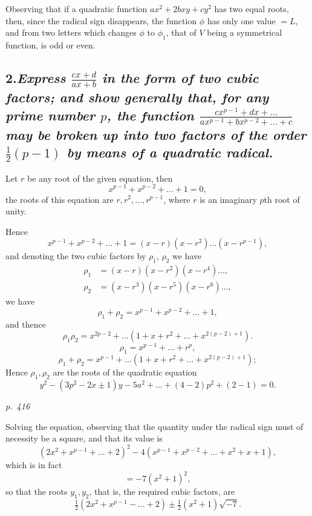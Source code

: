 \documentclass[11pt,a4paper]{article}
\theoremstyle{plain}
\theoremstyle{definition}
\begin{document}
Observing that if a quadratic function $a x^2 + 2 b x y + c y^2$ has two equal roots, then,
since the radical sign disappears, the function $\phi$ has only one value $= L$, and from
two letters which changes $\phi$ to $\phi_1$, that of $V$ being a symmetrical function,
is odd or even.

\subsection*{2.\quad \textit{Express $\frac{c x + d}{a x + b}$ in the form of two cubic factors; and show generally that, for any prime number $p$, the function $\frac{c x^{p-1} + d x + \ldots}{a x^{p-1} + b x^{p-2} + \ldots + c}$ may be broken up into two factors of the order $\frac{1}{2}(p-1)$ by means of a quadratic radical.}}

Let $r$ be any root of the given equation, then
\[
x^{p-1} + x^{p-2} + \ldots + 1 = 0,
\]
the roots of this equation are $r, r^2, \ldots, r^{p-1}$, where $r$ is an imaginary $p$th root of unity.

Hence
\[
x^{p-1} + x^{p-2} + \ldots + 1 = (x - r)(x - r^2) \ldots (x - r^{p-1}),
\]
and denoting the two cubic factors by $\rho_1$, $\rho_2$ we have
\begin{align*}
\rho_1 &= (x - r)(x - r^2)(x - r^4)\ldots, \\
\rho_2 &= (x - r^3)(x - r^5)(x - r^6)\ldots,
\end{align*}
we have
\[
\rho_1 + \rho_2 = x^{p-1} + x^{p-2} + \ldots + 1,
\]
and thence
\[
\rho_1 \rho_2 = x^{2p-2} + \ldots(1+x+r^2+\ldots+x^{2(p-2)+1}).
\]
\[
\rho_1 = x^{p-1} + \ldots + r^p,
\]
\[
\rho_1 + \rho_2 = x^{p-1} + \ldots(1+x+r^2+\ldots+x^{2(p-2)+1});
\]
Hence $\rho_1, \rho_2$ are the roots of the quadratic equation
\[
y^2 - (3 p^2 - 2 x \pm 1) y - 5 a^2 + \ldots + (4 - 2) p^2 + (2 - 1) = 0.
\]

\clearpage

\bigskip
\textit{p.~416}
\smallskip

\noindent
Solving the equation, observing that the quantity under the radical sign must of
necessity be a square, and that its value is
\[
(2 x^2 + x^{p-1} + \ldots + 2)^2 - 4 (x^{p-1} + x^{p-2} + \ldots + x^2 + x + 1),
\]
which is in fact
\[
= -7 (x^2 + 1)^2,
\]
so that the roots $y_1, y_2$, that is, the required cubic factors, are
\[
\tfrac{1}{2} (2 x^2 + x^{p-1} - \ldots + 2) \pm \tfrac{1}{2} (x^2 + 1) \sqrt{-7}.
\]
\end{document}
